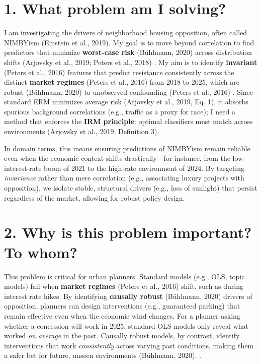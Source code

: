 \documentclass[11pt]{article}
\begin{document}
\section*{1. What problem am I solving?}
I am investigating the drivers of neighborhood housing opposition, often called NIMBYism (Einstein et al., 2019). My goal is to move beyond correlation to find predictors that minimize \textbf{worst-case risk} (Bühlmann, 2020) %
across distribution shifts (Arjovsky et al., 2019; Peters et al., 2018) %
. My aim is to identify \textbf{invariant} (Peters et al., 2016) %
features that predict resistance consistently across the distinct \textbf{market regimes} (Peters et al., 2016) %
from 2018 to 2025, which are robust (Bühlmann, 2020) %
to unobserved confounding (Peters et al., 2016) %
. Since standard ERM minimizes average risk (Arjovsky et al., 2019, Eq. 1), it absorbs spurious background correlations (e.g., traffic as a proxy for race); I need a method that enforces the \textbf{IRM principle}: optimal classifiers must match across environments (Arjovsky et al., 2019, Definition 3).

    In domain terms, this means ensuring predictions of NIMBYism remain reliable even when the economic context shifts drastically—for instance, from the low-interest-rate boom of 2021 to the high-rate environment of 2024. By targeting \textit{invariance} rather than mere correlation (e.g., associating luxury projects with opposition), we isolate stable, structural drivers (e.g., loss of sunlight) that persist regardless of the market, allowing for robust policy design.

\section*{2. Why is this problem important? To whom?}
This problem is critical for urban planners. Standard models (e.g., OLS, topic models) fail when \textbf{market regimes} (Peters et al., 2016) %
shift, such as during interest rate hikes. By identifying \textbf{causally robust} (Bühlmann, 2020) %
drivers of opposition, planners can design interventions (e.g., guaranteed parking) that remain effective even when the economic wind changes.
    For a planner asking whether a concession will work in 2025, standard OLS models only reveal what worked \textit{on average} in the past. Causally robust models, by contrast, identify interventions that work \textit{consistently} across varying past conditions, making them a safer bet for future, unseen environments (Bühlmann, 2020).
.
\end{document}
